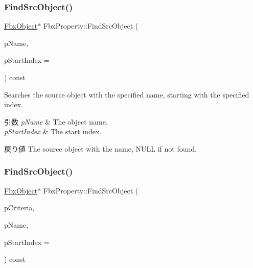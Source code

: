 \subsubsection{\texorpdfstring{Find\+Src\+Object()}{FindSrcObject()}\hspace{0.1cm}{\footnotesize\ttfamily [1/4]}}
{\footnotesize\ttfamily \hyperlink{class_fbx_object}{Fbx\+Object}$\ast$ Fbx\+Property\+::\+Find\+Src\+Object (\begin{DoxyParamCaption}\item[{const char $\ast$}]{p\+Name,  }\item[{const int}]{p\+Start\+Index = {} }\end{DoxyParamCaption}) const}

Searches the source object with the specified name, starting with the specified index. 
\begin{DoxyParams}{引数}
{\em p\+Name} & The object name. \\
\hline
{\em p\+Start\+Index} & The start index. \\
\hline
\end{DoxyParams}
\begin{DoxyReturn}{戻り値}
The source object with the name, N\+U\+LL if not found. 
\end{DoxyReturn}
\mbox{\label{class_fbx_property_a225b5e5f588ea9a0bacfc03c9843ee15}} 
\subsubsection{\texorpdfstring{Find\+Src\+Object()}{FindSrcObject()}\hspace{0.1cm}{\footnotesize\ttfamily [2/4]}}
{\footnotesize\ttfamily \hyperlink{class_fbx_object}{Fbx\+Object}$\ast$ Fbx\+Property\+::\+Find\+Src\+Object (\begin{DoxyParamCaption}\item[{const \hyperlink{class_fbx_criteria}{Fbx\+Criteria} \&}]{p\+Criteria,  }\item[{const char $\ast$}]{p\+Name,  }\item[{const int}]{p\+Start\+Index = {} }\end{DoxyParamCaption}) const}

